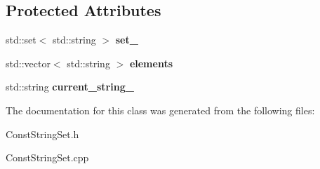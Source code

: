 \subsection*{Protected Attributes}
\begin{DoxyCompactItemize}
\item 
\mbox{\label{class_const_string_set_a10df2e2eb9996b186a5ebc5eb5bb39ff}} 
std\+::set$<$ std\+::string $>$ {\bfseries set\+\_\+}
\item 
\mbox{\label{class_const_string_set_a44b41982c0af8089d6305d1b7182e3ce}} 
std\+::vector$<$ std\+::string $>$ {\bfseries elements}
\item 
\mbox{\label{class_const_string_set_aaf3ae758c73013b2969da9db406d017f}} 
std\+::string {\bfseries current\+\_\+string\+\_\+}
\end{DoxyCompactItemize}


The documentation for this class was generated from the following files\+:\begin{DoxyCompactItemize}
\item 
Const\+String\+Set.\+h\item 
Const\+String\+Set.\+cpp\end{DoxyCompactItemize}
